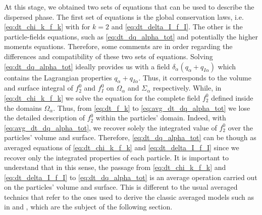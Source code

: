 At this stage, we obtained two sets of equations that can be used to describe the dispersed phase. 
The first set of equations is the global conservation laws, i.e. \ref{eq:dt_chi_k_f_k} with for $k=2$ and \ref{eq:dt_delta_I_f_I}. 
The other is the particle-fields equations, such as \ref{eq:dt_dq_alpha_tot} and potentially the higher moments equations.
Therefore, some comments are in order regarding the differences and compatibility of these two sets of equations.
Solving \ref{eq:dt_dq_alpha_tot} ideally provides us with a field $\delta_\alpha(q_\alpha+q_{I\alpha})$ which contains the Lagrangian properties $q_\alpha+q_{I\alpha}$.
Thus, it corresponds to the volume and surface integral of $f_2^0$ and $f_I^0$ on $\Omega_\alpha$ and $\Sigma_\alpha$ respectively.
While, in \ref{eq:dt_chi_k_f_k} we solve the equation for the complete field $f_2^0$ defined inside the domains $\Omega_\alpha$.  
Thus, from  \ref{eq:dt_f_k} to \ref{eq:avg_dt_dq_alpha_tot} we lose the detailed description of $f_2^0$ within the particles' domain.
Indeed, with \ref{eq:avg_dt_dq_alpha_tot}, we recover solely the integrated value of $f_2^0$ over the particles' volume and surface. 
Therefore, \ref{eq:dt_dq_alpha_tot} can be though as averaged equations of \ref{eq:dt_chi_k_f_k} and \ref{eq:dt_delta_I_f_I} since we recover only the integrated properties of each particle. 
It is important to understand that in this sense, the passage from \ref{eq:dt_chi_k_f_k} and \ref{eq:dt_delta_I_f_I} to \ref{eq:dt_dq_alpha_tot} is an average operation carried out on the particles' volume and surface.
This is different to the usual averaged technics that refer to the ones used to derive the classic averaged models such as in \citet{jackson1997locally} and \citet{zhang1994averaged}, which are the subject of the following section. 



